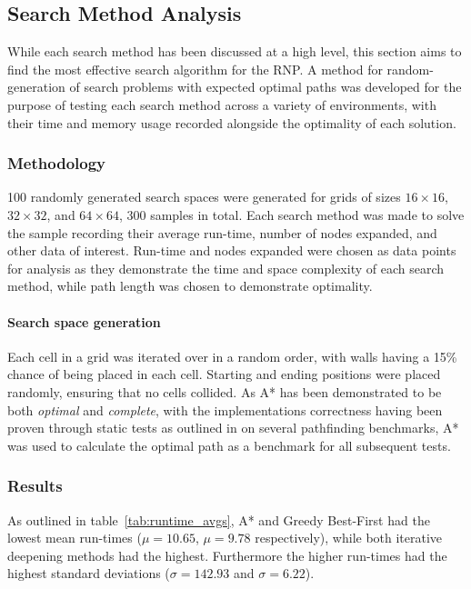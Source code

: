 
\subsection{Search Method Analysis} %
\label{sub:search_method_analysis}
While each search method has been discussed at a high level, this section aims to find the most effective search algorithm for the RNP. A method for random-generation of search problems with expected optimal paths was developed for the purpose of testing each search method across a variety of environments, with their time and memory usage recorded alongside the optimality of each solution.

\subsubsection{Methodology} %
\label{sub:methodology}

100 randomly generated search spaces were generated for grids of sizes $16 \times 16$, $32 \times 32$, and $64 \times 64$, 300 samples in total. Each search method was made to solve the sample recording their average run-time, number of nodes expanded, and other data of interest. Run-time and nodes expanded were chosen as data points for analysis as they demonstrate the time and space complexity of each search method, while path length was chosen to demonstrate optimality.

\paragraph{Search space generation} %
\label{par:search_space_generation}
Each cell in a grid was iterated over in a random order, with walls having a 15\% chance of being placed in each cell. Starting and ending positions were placed randomly, ensuring that no cells collided. As A* has been demonstrated to be both \textit{optimal} and \textit{complete}, with the implementations correctness having been proven through static tests as outlined in  on several pathfinding benchmarks, A* was used to calculate the optimal path as a benchmark for all subsequent tests.


\subsubsection{Results} %
\label{sub:results}
As outlined in table~\ref{tab:runtime_avgs}, A* and Greedy Best-First had the lowest mean run-times ($\mu=10.65$, $\mu=9.78$ respectively), while both iterative deepening methods had the highest. Furthermore the higher run-times had the highest standard deviations ($\sigma=142.93$ and $\sigma=6.22$).

